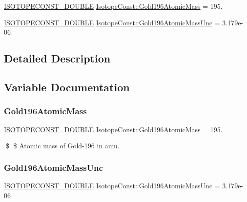 \begin{DoxyCompactItemize}
\item 
\mbox{\hyperlink{group___isotope_const-_macros_ga8f45a7272ce02c0b4c65c44636ed719a}{I\+S\+O\+T\+O\+P\+E\+C\+O\+N\+S\+T\+\_\+\+D\+O\+U\+B\+LE}} \mbox{\hyperlink{group___isotope_const-_gold-_au196_ga8df72094df8c080773170d9e3d1cf746}{Isotope\+Const\+::\+Gold196\+Atomic\+Mass}} = 195.
\item 
\mbox{\hyperlink{group___isotope_const-_macros_ga8f45a7272ce02c0b4c65c44636ed719a}{I\+S\+O\+T\+O\+P\+E\+C\+O\+N\+S\+T\+\_\+\+D\+O\+U\+B\+LE}} \mbox{\hyperlink{group___isotope_const-_gold-_au196_ga4be1120d28aa5d52892a7184544ab284}{Isotope\+Const\+::\+Gold196\+Atomic\+Mass\+Unc}} = 3.\+179e-\/06
\end{DoxyCompactItemize}


\subsection{Detailed Description}


\subsection{Variable Documentation}
\mbox{\label{group___isotope_const-_gold-_au196_ga8df72094df8c080773170d9e3d1cf746}} 
\subsubsection{\texorpdfstring{Gold196\+Atomic\+Mass}{Gold196AtomicMass}}
{\footnotesize\ttfamily \mbox{\hyperlink{group___isotope_const-_macros_ga8f45a7272ce02c0b4c65c44636ed719a}{I\+S\+O\+T\+O\+P\+E\+C\+O\+N\+S\+T\+\_\+\+D\+O\+U\+B\+LE}} Isotope\+Const\+::\+Gold196\+Atomic\+Mass = 195.}

\$ \$ Atomic mass of Gold-\/196 in amu. \mbox{\label{group___isotope_const-_gold-_au196_ga4be1120d28aa5d52892a7184544ab284}} 
\subsubsection{\texorpdfstring{Gold196\+Atomic\+Mass\+Unc}{Gold196AtomicMassUnc}}
{\footnotesize\ttfamily \mbox{\hyperlink{group___isotope_const-_macros_ga8f45a7272ce02c0b4c65c44636ed719a}{I\+S\+O\+T\+O\+P\+E\+C\+O\+N\+S\+T\+\_\+\+D\+O\+U\+B\+LE}} Isotope\+Const\+::\+Gold196\+Atomic\+Mass\+Unc = 3.\+179e-\/06}

